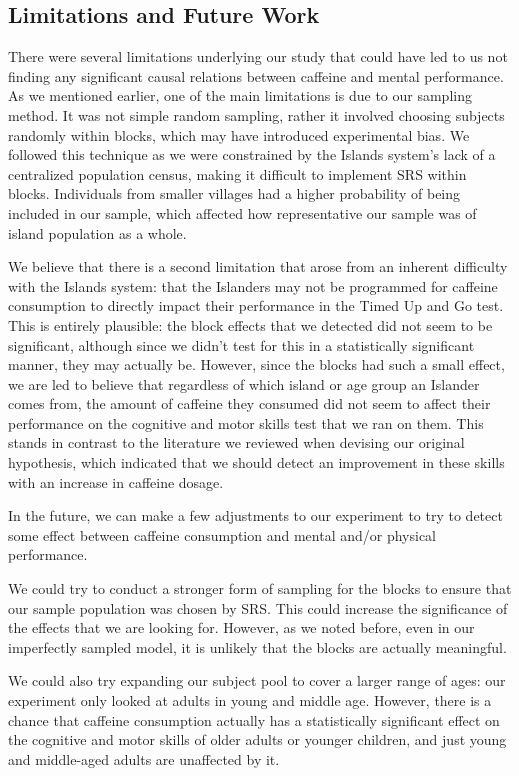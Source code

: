 \documentclass[11pt,a4paper,twoside]{tau-book}
\begin{document}
\subsection{Limitations and Future Work}
There were several limitations underlying our study that could have led to us not finding any significant causal relations between caffeine and mental performance. As we mentioned earlier, one of the main limitations is due to our sampling method. It was not simple random sampling, rather it involved choosing subjects randomly within blocks, which may have introduced experimental bias. We followed this technique as we were constrained by the Islands system’s lack of a centralized population census, making it difficult to implement SRS within blocks. Individuals from smaller villages had a higher probability of being included in our sample, which affected how representative our sample was of island population as a whole. 

We believe that there is a second limitation that arose from an inherent difficulty with the Islands system: that the Islanders may not be programmed for caffeine consumption to directly impact their performance in the Timed Up and Go test. This is entirely plausible: the block effects that we detected did not seem to be significant, although since we didn't test for this in a statistically significant manner, they may actually be. However, since the blocks had such a small effect, we are led to believe that regardless of which island or age group an Islander comes from, the amount of caffeine they consumed did not seem to affect their performance on the cognitive and motor skills test that we ran on them. This stands in contrast to the literature we reviewed when devising our original hypothesis, which indicated that we should detect an improvement in these skills with an increase in caffeine dosage. 

In the future, we can make a few adjustments to our experiment to try to detect some effect between caffeine consumption and mental and/or physical performance. 

We could try to conduct a stronger form of sampling for the blocks to ensure that our sample population was chosen by SRS. This could increase the significance of the effects that we are looking for. However, as we noted before, even in our imperfectly sampled model, it is unlikely that the blocks are actually meaningful. 

We could also try expanding our subject pool to cover a larger range of ages: our experiment only looked at adults in young and middle age. However, there is a chance that caffeine consumption actually has a statistically significant effect on the cognitive and motor skills of older adults or younger children, and just young and middle-aged adults are unaffected by it. 
\end{document}
